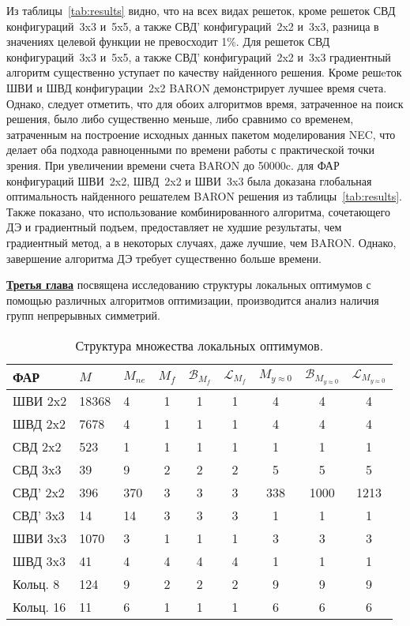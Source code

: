 Из таблицы~\ref{tab:results} видно, что на всех видах решеток, кроме решеток СВД конфигураций~3x3 и~5x5, а также СВД' конфигураций~2x2 и~3x3, разница в значениях целевой функции не превосходит 1\%. Для решеток СВД конфигураций~3x3 и~5x5, а также СВД' конфигураций~2x2 и~3x3 градиентный алгоритм существенно уступает по качеству найденного решения. Кроме решeток ШВИ и ШВД конфигурации~2x2 BARON демонстрирует лучшее время счета. Однако, следует отметить, что для обоих алгоритмов время, затраченное на поиск решения, было либо существенно меньше, либо сравнимо со временем, затраченным на построение исходных данных пакетом моделирования NEC, что делает оба подхода равноценными по времени работы с практической точки зрения. При увеличении времени счета BARON до 50000c. для ФАР конфигураций ШВИ~2x2, ШВД~2x2 и ШВИ~3x3 была доказана глобальная оптимальность найденного решателем BARON решения из таблицы~\ref{tab:results}.
Также показано, что использование комбинированного алгоритма, сочетающего ДЭ и градиентный подъем, предоставляет не худшие результаты, чем градиентный метод, а в некоторых случаях, даже лучшие, чем BARON. Однако, завершение алгоритма ДЭ требует существенно больше времени.

\underline{\textbf{Третья глава}} посвящена исследованию структуры локальных оптимумов с помощью различных алгоритмов оптимизации,
производится анализ наличия групп непрерывных симметрий.

\begin{table}[!h]
\centering
\caption{Структура множества локальных оптимумов.}
\begin{tabular}{|l | l l | c c c | c c c|}
    \hline
    \textbf{ФАР} & \textbf{$M$} & \textbf{$M_{ne}$} & \textbf{$M_{f}$} & \textbf{$\mathcal{B}_{M_f}$} & \textbf{$\mathcal{L}_{M_f}$} & \textbf{$M_{y\approx0}$} & \textbf{$\mathcal{B}_{M_{y\approx0}}$} & \textbf{$\mathcal{L}_{M_{y\approx0}}$}\\
    \hline
    ШВИ 2x2 & 18368 & 4 & 1 & 1 & 1 & 4 & 4 & 4\\
    ШВД 2x2 & 7678  & 4 & 1 & 1 & 1 & 4 & 4 & 4\\
    СВД 2x2  & 523  & 1 & 1 & 1 & 1 & 1 & 1 & 1\\
    СВД 3x3  & 39  & 9 & 2 & 2 & 2 & 5 & 5 & 5\\
    СВД' 2x2  & 396  & 370 & 3 & 3 & 3 & 338 & 1000 & 1213\\
    СВД' 3x3  & 14  & 14 & 3 & 3 & 3 & 1 & 1 & 1\\
    ШВИ 3x3 & 1070  & 3 & 1 & 1 & 1 & 3 & 3 & 3 \\
    ШВД 3x3 & 41  & 4 & 4 & 4 & 4 & 1 & 1 & 1 \\
    Кольц. 8 & 124  & 9 & 2 & 2 & 2 & 9 & 9 & 9\\
    Кольц. 16 & 11  & 6 & 1 & 1 & 1& 6 & 6 & 6\\
    \hline
\end{tabular}
    \label{tab:structure}
\end{table}

